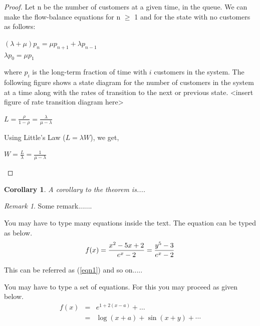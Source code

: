 \documentclass[12pt,a4paper]{report}
\theoremstyle{plain}
\newtheorem{corollary}[theorem]{Corollary}
\theoremstyle{definition}
\theoremstyle{remark}
\newtheorem{remark}[theorem]{Remark}
\begin{document}
\begin{proof}
Let n be the number of customers at a given time, in the queue. We can make the flow-balance equations for n $\ge$ 1 and for the state with no customers as follows:
\begin{center}
$(\lambda + \mu)p_n = \mu p_{n+1} + \lambda p_{n-1}$ \\
$\lambda p_0 = \mu p_1$ \\
\end{center}
where $p_i$ is the long-term fraction of time with $i$ customers in the system. The following figure shows a state diagram for the number of customers in the system at a time along with the rates of transition to the next or previous state.
<insert figure of rate transition diagram here>

\begin{center}
$L = \frac{\rho}{1-\rho} = \frac{\lambda}{\mu - \lambda}$
\end{center}
Using Little's Law ($L = \lambda W$), we get,
\begin{center}
	 $W = \frac{L}{\lambda} = \frac{1}{\mu - \lambda}$
\end{center}
\end{proof}
\vspace{20mm}

\begin{corollary}
A corollary to the theorem is....
\end{corollary}

\begin{remark}
Some remark.......
\end{remark}


You may have to type many equations inside the text.  The equation can be typed as below.
\begin{equation}\label{eqn1}
f(x) = \frac{x^2-5x+2}{e^x - 2} = {y^5-3 \over e^x-2} %
\end{equation}

This can be referred as (\ref{eqn1}) and so on.....

You may have to type a set of equations.  For this you may proceed as given below.
\begin{eqnarray}
f(x) &=& e^{1+2(x-a)} + \ldots   \nonumber   \\
  &=& \log(x+a) + \sin(x+y) + \cdots  \label{eqn2}
\end{eqnarray}

\end{document}
